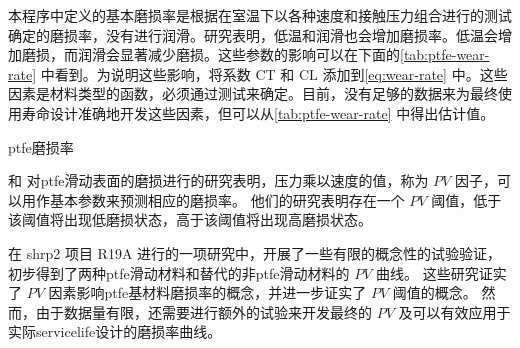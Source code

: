 本程序中定义的基本磨损率是根据在室温下以各种速度和接触压力组合进行的测试确定的磨损率，没有进行润滑。研究表明，低温和润滑也会增加磨损率\cite{stanton1999h}。低温会增加磨损，而润滑会显著减少磨损。这些参数的影响可以在下面的\cref{tab:ptfe-wear-rate} 中看到。为说明这些影响，将系数 $\text{CT}$ 和 $\text{CL}$ 添加到\cref{eq:wear-rate} 中。这些因素是材料类型的函数，必须通过测试来确定。目前，没有足够的数据来为最终使用寿命设计准确地开发这些因素，但可以从\cref{tab:ptfe-wear-rate} 中得出估计值。

\begin{table}
  \caption{\acrlong*{ptfe}磨损率}
  \label{tab:ptfe-wear-rate}
  
\end{table}


 和   对\acrlong{ptfe}滑动表面的磨损进行的研究表明，压力乘以速度的值，称为 $PV$ 因子，可以用作基本参数来预测相应的磨损率。 他们的研究表明存在一个 $PV$ 阈值，低于该阈值将出现低磨损状态，高于该阈值将出现高磨损状态。


在 \gls*{shrp}2 项目 R19A 进行的一项研究中，开展了一些有限的概念性的试验验证，初步得到了两种\acrlong*{ptfe}滑动材料和替代的非\acrlong*{ptfe}滑动材料的 $PV$ 曲线。 这些研究证实了 $PV$ 因素影响\acrlong*{ptfe}基材料磨损率的概念，并进一步证实了 $PV$ 阈值的概念。 然而，由于数据量有限，还需要进行额外的试验来开发最终的 $PV$ 及可以有效应用于实际\gls*{servicelife}设计的磨损率曲线。


